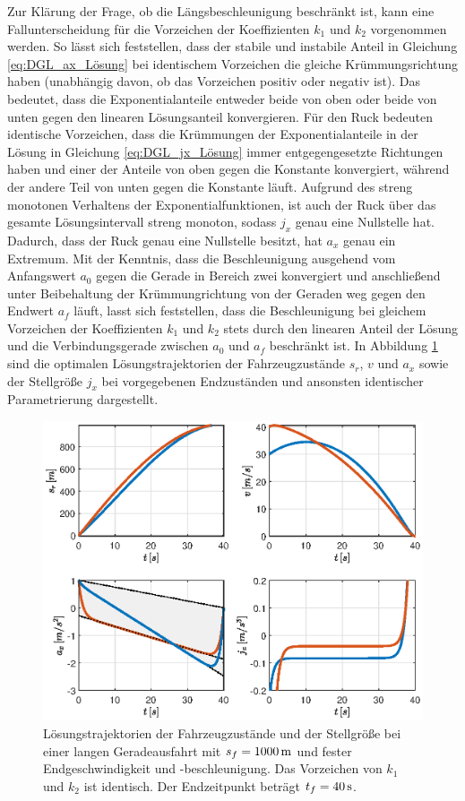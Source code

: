 Zur Klärung der Frage, ob die Längsbeschleunigung beschränkt ist, kann eine Fallunterscheidung für die Vorzeichen der Koeffizienten $k_1$ und $k_2$ vorgenommen werden. So lässt sich feststellen, dass der stabile und instabile Anteil in Gleichung \eqref{eq:DGL_ax_Lösung} bei identischem Vorzeichen die gleiche Krümmungsrichtung haben (unabhängig davon, ob das Vorzeichen positiv oder negativ ist). Das bedeutet, dass die Exponentialanteile entweder beide von oben oder beide von unten gegen den linearen Lösungsanteil konvergieren. Für den Ruck bedeuten identische Vorzeichen, dass die Krümmungen der Exponentialanteile in der Lösung in Gleichung \eqref{eq:DGL_jx_Lösung} immer entgegengesetzte Richtungen haben und einer der Anteile von oben gegen die Konstante konvergiert, während der andere Teil von unten gegen die Konstante läuft. Aufgrund des streng monotonen Verhaltens der Exponentialfunktionen, ist auch der Ruck über das gesamte Lösungsintervall streng monoton, sodass $j_x$ genau eine Nullstelle hat. Dadurch, dass der Ruck genau eine Nullstelle besitzt, hat $a_x$ genau ein Extremum. Mit der Kenntnis, dass die Beschleunigung ausgehend vom Anfangswert $a_0$ gegen die Gerade in Bereich zwei konvergiert und anschließend unter Beibehaltung der Krümmungrichtung von der Geraden weg gegen den Endwert $a_f$ läuft, lasst sich feststellen, dass die Beschleunigung bei gleichem Vorzeichen der Koeffizienten $k_1$ und $k_2$ stets durch den linearen Anteil der Lösung und die Verbindungsgerade zwischen $a_0$ und $a_f$ beschränkt ist. In Abbildung \ref{fig:vf_af_fest_gleiches_VZ} sind die optimalen Lösungstrajektorien der Fahrzeugzustände $s_r$, $v$ und $a_x$ sowie der Stellgröße $j_x$ bei vorgegebenen Endzuständen und ansonsten identischer Parametrierung dargestellt. 
\begin{figure}[h] 
	\centering
	\includegraphics[width=\linewidth]{./Bilder/Ergebnisse/Geradeausfahrt/vf_af_fest_gleiches_VZ.eps}
	\caption{Lösungstrajektorien der Fahrzeugzustände und der Stellgröße bei einer langen Geradeausfahrt mit $s_f=1000\,\mathrm{m}$ und fester Endgeschwindigkeit und -beschleunigung. Das Vorzeichen von $k_1$ und $k_2$ ist identisch. Der Endzeitpunkt beträgt $t_f = 40\,\mathrm{s}$.}
	\label{fig:vf_af_fest_gleiches_VZ}
\end{figure}
